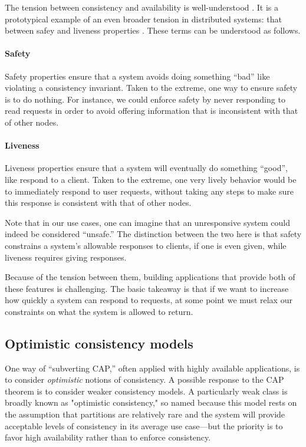 The tension between consistency and availability is well-understood
\cite{10.1145/5505.5508}. It is a prototypical example of an even
broader tension in distributed systems: that between safey and
liveness properties \cite{2012perspectivesCAP}. These terms can be
understood as follows.

\paragraph{Safety}
Safety properties ensure that a system avoids doing something ``bad''
like violating a consistency invariant. Taken to the extreme, one way
to ensure safety is to do nothing. For instance, we could enforce
safety by never responding to read requests in order to avoid offering
information that is inconsistent with that of other nodes.

\paragraph{Liveness}
Liveness properties ensure that a system will eventually do something
``good'', like respond to a client. Taken to the extreme, one very
lively behavior would be to immediately respond to user requests,
without taking any steps to make sure this response is consistent with
that of other nodes.

Note that in our use cases, one can imagine that an unresponsive
system could indeed be considered ``unsafe.'' The distinction between
the two here is that safety constrains a system's allowable responses
to clients, if one is even given, while liveness requires giving
responses.

Because of the tension between them, building applications that
provide both of these features is challenging. The basic takeaway is
that if we want to increase how quickly a system can respond to
requests, at some point we must relax our constraints on what the
system is allowed to return.

\subsection{Optimistic consistency models}
One way of ``subverting CAP,'' often applied with highly available
applications, is to consider \emph{optimistic} notions of consistency.  A
possible response to the CAP theorem is to consider weaker consistency
models. A particularly weak class is broadly known as "optimistic
consistency," so named because this model rests on the assumption that
partitions are relatively rare and the system will provide acceptable
levels of consistency in its average use case---but the priority is to
favor high availability rather than to enforce consistency.

